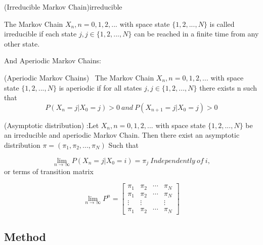 \begin{definition}{(Irreducible Markov Chain)}{irreducible}

The Markov Chain $X_n,n = 0,1,2,...$ with space state $\{1,2,...,N\}$
is called irreducible if each state $j,j \in \{1,2,...,N\}$ can be
reached in a finite time from any other state.
\end{definition}

And Aperiodic Markov Chains:

\begin{definition}{(Aperiodic Markov Chains)} 
\ The Markov Chain $X_n,n = 0,1,2,...$ with space state $\{1,2,...,N\}$
is aperiodic if for all states $j,j \in \{1,2,...,N\}$ there exists n such that \begin{equation}
    P(X_n = j|X_0 = j) >0 \ and \  P(X_{n+1} = j|X_0 = j) >0
\end{equation}
\end{definition}

\begin{theorem}{(Asymptotic distribution)}
    :Let $X_n,n = 0,1,2,...$ with space state $\{1,2,...,N\}$ be an
irreducible and aperiodic Markov Chain. Then there exist an asymptotic distribution $\pi=(\pi_1,\pi_2,...,\pi_N)$ Such that 

\begin{equation}
    \lim_{n \to\infty} P(X_n = j|X_0 = i) = \pi_j\ Independently\ of\ i,
\end{equation}
or terms of transition matrix

\begin{equation}
    \lim_{n \to\infty} P^n = \begin{bmatrix}
\pi_1 & \pi_2 & \cdots & \pi_N \\
\pi_1 & \pi_2 & \cdots & \pi_N \\
\vdots  & \vdots  &  & \vdots  \\
\pi_1 & \pi_2 & \cdots & \pi_N 
\end{bmatrix}
\end{equation}
\end{theorem}




\subsection{Method}
\label{sec:method1}

